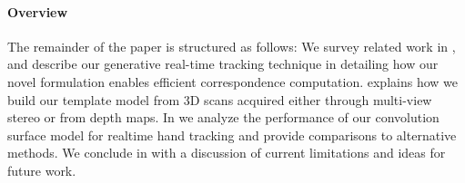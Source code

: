 %

\paragraph{Overview}
The remainder of the paper is structured as follows: We survey related work in , and describe our generative real-time tracking technique in  detailing how our novel formulation enables efficient correspondence computation.
% 
 explains how we build our template model from 3D scans acquired either through multi-view stereo or from depth maps.
% 
In  we analyze the performance of our convolution surface model for realtime hand tracking and provide comparisons to alternative methods. 
% 
We conclude in  with a discussion of current limitations and ideas for future work.
 




